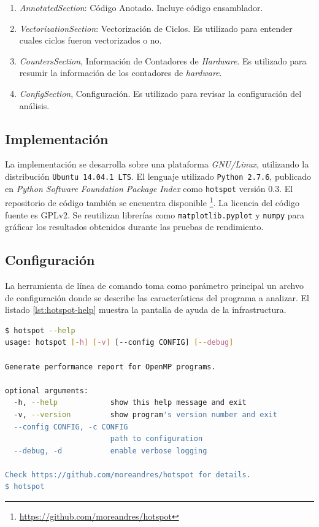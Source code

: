 \documentclass[a4paper]{report}
\begin{document}
\begin{enumerate}
\item {\it AnnotatedSection}: Código Anotado. Incluye código ensamblador. 
\item {\it VectorizationSection}: Vectorización de Ciclos. Es utilizado para entender cuales ciclos fueron vectorizados o no.
\item {\it CountersSection}, Información de Contadores de {\it Hardware}. Es utilizado para resumir la información de los contadores de {\it hardware}.
\item {\it ConfigSection}, Configuración. Es utilizado para revisar la configuración del análisis.
\end{enumerate}

\subsection{Implementación}

La implementación se desarrolla sobre una plataforma {\it GNU/Linux}, utilizando la distribución {\tt Ubuntu 14.04.1 LTS}.
El lenguaje utilizado {\tt Python 2.7.6}, publicado en {\it Python Software Foundation Package Index} como {\tt hotspot} versión 0.3.
El repositorio de código también se encuentra disponible \footnote{\href{https://github.com/moreandres/hotspot}{https://github.com/moreandres/hotspot}}.
La licencia del código fuente es GPLv2. Se reutilizan librerías como {\tt matplotlib.pyplot} \cite{matplotlib} y {\tt numpy} \cite{numpy} para gráficar los resultados obtenidos durante las pruebas de rendimiento.

\subsection{Configuración}

La herramienta de línea de comando toma como parámetro principal un archvo de configuración donde se describe las características del programa a analizar. 
El listado \ref{lst:hotspot-help} muestra la pantalla de ayuda de la infrastructura.

\begin{lstlisting}[language=bash, caption={Ayuda de {\tt hotspot}}, label={lst:hotspot-help}]
$ hotspot --help
usage: hotspot [-h] [-v] [--config CONFIG] [--debug]

Generate performance report for OpenMP programs.

optional arguments:
  -h, --help            show this help message and exit
  -v, --version         show program's version number and exit
  --config CONFIG, -c CONFIG
                        path to configuration
  --debug, -d           enable verbose logging

Check https://github.com/moreandres/hotspot for details.
$ hotspot
\end{lstlisting}
\end{document}
